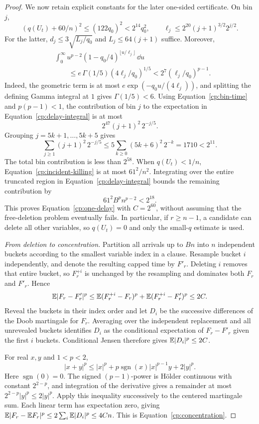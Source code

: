 \begin{proof}
We now retain explicit constants for the later one-sided certificate.
On bin $j$,
\[
 (q(U_t)+60/n)^2\le(122q_0)^2<2^{14}q_0^2,
 \qquad
 \ell_j\le2^{20}(j+1)^{3/2}2^{j/2}.
\]
For the latter, $d_j\le3\sqrt{L_j/q_0}$ and
$L_j\le64(j+1)$ suffice. Moreover,
\[
 \begin{split}
 &\int_0^\infty u^{p-2}
     (1-q_0/4)^{\lfloor u/\ell_j\rfloor}\,\dd u\\
 &\qquad\le
 e\,\Gamma(1/5)(4\ell_j/q_0)^{1/5}
 <2^7(\ell_j/q_0)^{p-1}.
 \end{split}
\]
Indeed, the geometric term is at most
$e\exp(-q_0u/(4\ell_j))$, and splitting the defining Gamma integral
at $1$ gives $\Gamma(1/5)<6$. Using
Equation~\eqref{cp:bin-time} and $p(p-1)<1$, the contribution of bin $j$
to the expectation in Equation~\eqref{cp:delay-integral} is at most
\[
 2^{47}(j+1)^2\,2^{-j/5}.
\]
Grouping $j=5k+1,\ldots,5k+5$ gives
\[
 \sum_{j\ge1}(j+1)^2\,2^{-j/5}
 \le5\sum_{k\ge0}(5k+6)^2\,2^{-k}
 =1710<2^{11}.
\]
The total bin contribution is less than $2^{58}$.
When $q(U_t)<1/n$, Equation~\eqref{cp:incident-killing} is at most
$61^2/n^2$. Integrating over the entire truncated region in
Equation~\eqref{cp:delay-integral} bounds the remaining contribution by
\[
 61^2 B^p n^{p-2}<2^{18}.
\]
This proves Equation~\eqref{cp:one-delay} with $C=2^{60}$, without assuming
that the free-deletion problem eventually fails. In particular, if
$r\ge n-1$, a candidate can delete all other variables, so $q(U_t)=0$
and only the small-$q$ estimate is used.

\emph{From deletion to concentration.}
Partition all arrivals up to $Bn$ into $n$ independent
buckets according to the smallest variable index in a clause. Resample
bucket $i$ independently, and denote the resulting capped time by $F'_r$.
Deleting $i$ removes that entire bucket, so $F_r^{+i}$ is unchanged by
the resampling and dominates both $F_r$ and $F'_r$. Hence
\[
 \mathbb E|F_r-F'_r|^p
 \le\mathbb E(F_r^{+i}-F_r)^p+\mathbb E(F_r^{+i}-F'_r)^p
 \le2C.
\]
Reveal the buckets in their index order and let $D_i$ be the successive
differences of the Doob martingale for $F_r$. Averaging over the independent
replacement and all unrevealed buckets identifies $D_i$ as the conditional
expectation of $F_r-F'_r$ given the first $i$ buckets. Conditional Jensen
therefore gives $\mathbb E|D_i|^p\le2C$.

For real $x,y$ and $1<p<2$,
\[
 |x+y|^p\le |x|^p
 +p\operatorname{sgn}(x)|x|^{p-1}y+2|y|^p.
\]
Here $\operatorname{sgn}(0)=0$. The signed $(p-1)$-power is
H\"older continuous with constant
$2^{2-p}$, and integration of the derivative gives a remainder at most
$2^{2-p}|y|^p\le2|y|^p$. Apply this inequality successively to the
centered martingale sum. Each linear term has expectation zero, giving
$\mathbb E|F_r-\mathbb E F_r|^p\le2\sum_i\mathbb E|D_i|^p\le4Cn$.
This is Equation~\eqref{cp:concentration}.
\end{proof}


